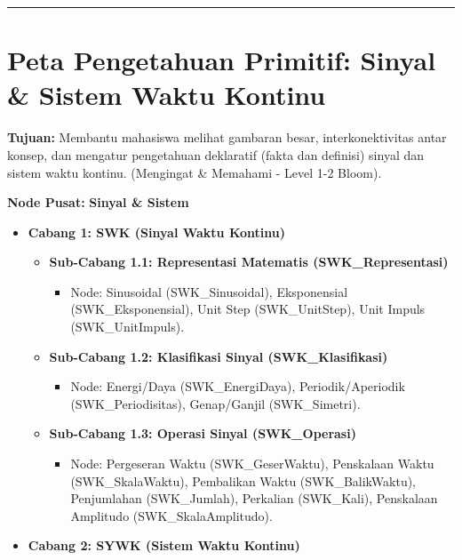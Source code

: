 \documentclass[
  letterpaper,
  DIV=11,
  numbers=noendperiod]{scrreprt}
\providecommand{\tightlist}{%
  \setlength{\itemsep}{0pt}\setlength{\parskip}{0pt}}\usepackage{longtable,booktabs,array}
\begin{document}
\begin{center}\rule{0.5\linewidth}{0.5pt}\end{center}

\section{Peta Pengetahuan Primitif: Sinyal \& Sistem Waktu
Kontinu}\label{peta-pengetahuan-primitif-sinyal-sistem-waktu-kontinu}

\textbf{Tujuan:} Membantu mahasiswa melihat gambaran besar,
interkonektivitas antar konsep, dan mengatur pengetahuan deklaratif
(fakta dan definisi) sinyal dan sistem waktu kontinu. (Mengingat \&
Memahami - Level 1-2 Bloom).

\textbf{Node Pusat:} \textbf{Sinyal \& Sistem}

\begin{itemize}
\item
  \textbf{Cabang 1: SWK (Sinyal Waktu Kontinu)}

  \begin{itemize}
  \tightlist
  \item
    \textbf{Sub-Cabang 1.1: Representasi Matematis (SWK\_Representasi)}

    \begin{itemize}
    \tightlist
    \item
      Node: Sinusoidal (SWK\_Sinusoidal), Eksponensial
      (SWK\_Eksponensial), Unit Step (SWK\_UnitStep), Unit Impuls
      (SWK\_UnitImpuls).
    \end{itemize}
  \item
    \textbf{Sub-Cabang 1.2: Klasifikasi Sinyal (SWK\_Klasifikasi)}

    \begin{itemize}
    \tightlist
    \item
      Node: Energi/Daya (SWK\_EnergiDaya), Periodik/Aperiodik
      (SWK\_Periodisitas), Genap/Ganjil (SWK\_Simetri).
    \end{itemize}
  \item
    \textbf{Sub-Cabang 1.3: Operasi Sinyal (SWK\_Operasi)}

    \begin{itemize}
    \tightlist
    \item
      Node: Pergeseran Waktu (SWK\_GeserWaktu), Penskalaan Waktu
      (SWK\_SkalaWaktu), Pembalikan Waktu (SWK\_BalikWaktu), Penjumlahan
      (SWK\_Jumlah), Perkalian (SWK\_Kali), Penskalaan Amplitudo
      (SWK\_SkalaAmplitudo).
    \end{itemize}
  \end{itemize}
\item
  \textbf{Cabang 2: SYWK (Sistem Waktu Kontinu)}


\end{itemize}
\end{document}
